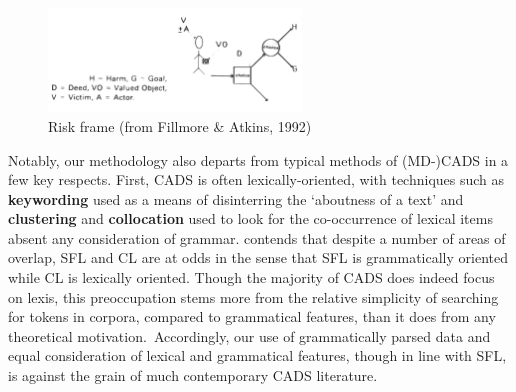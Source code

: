             \begin{figure}[htb!]
            \centering
            \includegraphics[width=0.6\textwidth]{../images/riskframe.png}
            \caption{Risk frame (from Fillmore \& Atkins, 1992)}
            \label{fig:fil_atk}
            \end{figure}

		

		Notably, our methodology also departs from typical methods of (MD-)CADS in a few key respects. First, CADS is often lexically-oriented, with techniques such as \textbf{keywording} used as a means of disinterring the `aboutness of a text' \cite{baker_querying_2004} and \textbf{clustering} and \textbf{collocation} used to look for the co-occurrence of lexical items absent any consideration of grammar.  contends that despite a number of areas of overlap, SFL and CL are at odds in the sense that SFL is grammatically oriented while CL is lexically oriented. Though the majority of CADS does indeed focus on lexis, this preoccupation stems more from the relative simplicity of searching for tokens in corpora, compared to grammatical features, than it does from any theoretical motivation.~Accordingly, our use of grammatically parsed data and equal consideration of lexical and grammatical features, though in line with SFL, is against the grain of much contemporary CADS literature.

